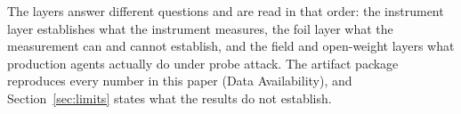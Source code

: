 The layers answer different questions and are read in that order: the
instrument layer establishes what the instrument measures, the foil layer
what the measurement can and cannot establish, and the field and open-weight
layers what production agents actually do under probe attack. The artifact
package reproduces every number in this paper (Data Availability), and
Section~\ref{sec:limits} states what the results do not establish.


